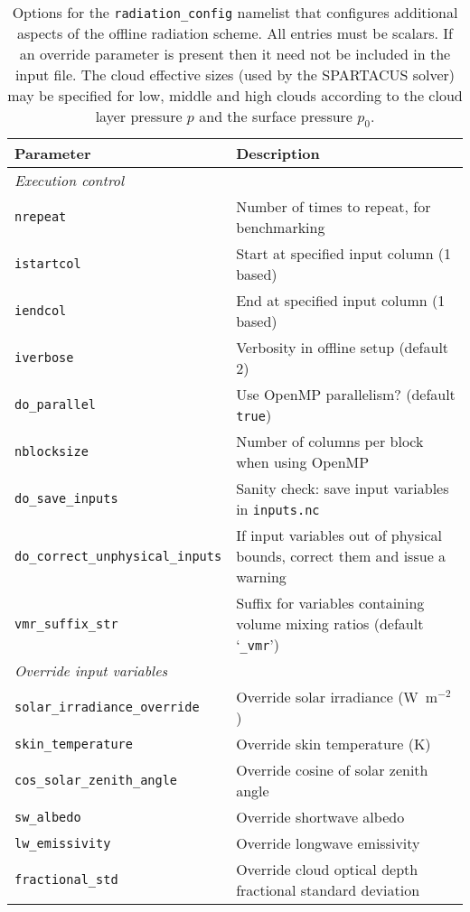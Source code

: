 \documentclass[a4,oneside]{article}
\def\tablesetup{\rowcolors{2}{light-gray}{light-gray}\footnotesize}
\def\codesize{\small}
\def\codetabsize{\footnotesize}
\def\code#1{{\codesize\texttt{#1}}}
\def\codetab#1{{\codetabsize\texttt{#1}}}
\begin{document}
\begin{center}
\tablesetup
\begin{longtable}{ll}
%
\caption{\label{tab:nam_radiation_config}Options for the
  \code{radiation\_config} namelist that configures additional aspects
  of the offline radiation scheme. All entries must be scalars. If an
  override parameter is present then it need not be included in the
  input file. The cloud effective sizes (used by the SPARTACUS solver)
  may be specified for low, middle and high clouds according to the
  cloud layer pressure $p$ and the surface pressure $p_0$.}\\
%
\hline
Parameter & Description\\
\hline
\multicolumn{2}{l}{\emph{Execution control}}\\
\codetab{nrepeat}  & Number of times to repeat, for benchmarking\\
\codetab{istartcol} & Start at specified input column (1 based)\\
\codetab{iendcol} & End at specified input column (1 based)\\
\codetab{iverbose} & Verbosity in offline setup (default 2)\\
\codetab{do\_parallel} & Use OpenMP parallelism? (default \codetab{true})\\
\codetab{nblocksize} & Number of columns per block when using OpenMP\\
\codetab{do\_save\_inputs} & Sanity check: save input variables in \codetab{inputs.nc}\\
\codetab{do\_correct\_unphysical\_inputs} & If input variables out of physical bounds, correct them and issue a warning\\
\codetab{vmr\_suffix\_str} & Suffix for variables containing volume mixing ratios (default `\code{\_vmr}')\\
\hline
\multicolumn{2}{l}{\emph{Override input variables}}\\
\codetab{solar\_irradiance\_override} & Override solar irradiance (W~m$^{-2}$)\\
\codetab{skin\_temperature} & Override skin temperature (K)\\
\codetab{cos\_solar\_zenith\_angle} & Override cosine of solar zenith angle\\
\codetab{sw\_albedo} & Override shortwave albedo\\
\codetab{lw\_emissivity} & Override longwave emissivity\\
\codetab{fractional\_std} & Override cloud optical depth fractional standard deviation\\

\end{longtable}
\end{center}
\end{document}
